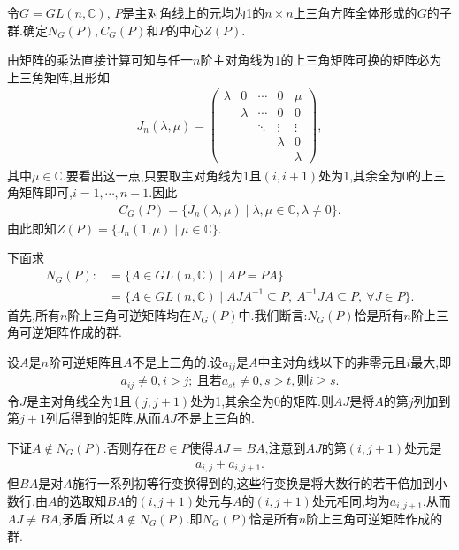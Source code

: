 \documentclass[../../main.tex]{subfiles}%
\begin{document}
\begin{example}
令$G=GL(n,\mathbb{C})$, $P$是主对角线上的元均为1的$n\times n$上三角方阵全体形成的$G$的子群.确定$N_G(P),C_G(P)$和$P$的中心$Z(P)$.
\end{example}
\begin{solution}
由矩阵的乘法直接计算可知与任一$n$阶主对角线为1的上三角矩阵可换的矩阵必为上三角矩阵,且形如
\begin{align*}
J_n(\lambda,\mu)=\begin{pmatrix}
\lambda & 0 & \cdots & 0 & \mu \\
& \lambda & \cdots & 0 & 0 \\
& & \ddots & \vdots & \vdots \\
& & & \lambda & 0 \\
& & & & \lambda
\end{pmatrix},
\end{align*}
其中$\mu\in\mathbb{C}$.要看出这一点,只要取主对角线为1且$(i,i+1)$处为1,其余全为0的上三角矩阵即可,$i=1,\cdots,n-1$.因此
\begin{align*}
C_G(P)=\{J_n(\lambda,\mu)\mid \lambda,\mu\in\mathbb{C},\lambda\ne 0\}.
\end{align*}
由此即知$Z(P)=\{J_n(1,\mu)\mid \mu\in\mathbb{C}\}$.

下面求
\begin{align*}
N_G(P):&=\{A\in GL(n,\mathbb{C})\mid AP=PA\} \\
&=\{A\in GL(n,\mathbb{C})\mid AJA^{-1}\subseteq P,\ A^{-1}JA\subseteq P,\ \forall J\in P\}.
\end{align*}
首先,所有$n$阶上三角可逆矩阵均在$N_G(P)$中.我们断言:$N_G(P)$恰是所有$n$阶上三角可逆矩阵作成的群.

设$A$是$n$阶可逆矩阵且$A$不是上三角的.设$a_{ij}$是$A$中主对角线以下的非零元且$i$最大,即
\begin{align*}
a_{ij}\ne 0,i>j;\ \text{且若}a_{st}\ne 0,s>t,\text{则}i\geqslant s.
\end{align*}
令$J$是主对角线全为1且$(j,j+1)$处为1,其余全为0的矩阵.则$AJ$是将$A$的第$j$列加到第$j+1$列后得到的矩阵,从而$AJ$不是上三角的.

下证$A\notin N_G(P)$.否则存在$B\in P$使得$AJ=BA$,注意到$AJ$的第$(i,j+1)$处元是
\begin{align*}
a_{i,j}+a_{i,j+1}.
\end{align*}
但$BA$是对$A$施行一系列初等行变换得到的,这些行变换是将大数行的若干倍加到小数行.由$A$的选取知$BA$的$(i,j+1)$处元与$A$的$(i,j+1)$处元相同,均为$a_{i,j+1}$,从而$AJ\ne BA$,矛盾.所以$A\notin N_G(P)$.即$N_G(P)$恰是所有$n$阶上三角可逆矩阵作成的群.

\end{solution}
\end{document}

